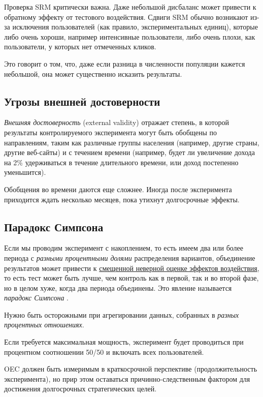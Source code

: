 \documentclass[%
	11pt,
	a4paper,
	utf8,
		]{article}
\begin{document}
Проверка SRM критически важна. Даже небольшой дисбаланс может привести к обратному эффекту от тестового воздействия. Сдвиги SRM обычно возникают из-за исключения пользователей (как правило, экспериментальных единиц), которые либо очень хороши, например интенсивные пользователи, либо очень плохи, как пользователи, у которых нет отмеченных кликов.

Это говорит о том, что, даже если разница в численности популяции кажется небольшой, она может существенно исказить результаты.

\subsection{Угрозы внешней достоверности}

\emph{Внешняя достоверность} (external validity) отражает степень, в которой результаты контролируемого эксперимента могут быть обобщены по направлениям, таким как различные группы населения (например, другие страны, другие веб-сайты) и с течением времени (например, будет ли увеличение дохода на 2\% удерживаться в течение длительного времени, или доход постепенно уменьшится). 

Обобщения во времени даются еще сложнее. Иногда после эксперимента приходится ждать несколько месяцев, пока утихнут долгосрочные эффекты.

\subsection{Парадокс Симпсона}

Если мы проводим эксперимент с накоплением, то есть имеем два или более периода с \emph{\color{red}разными процентными долями} распределения вариантов, объединение результатов может привести к \underline{смещенной неверной оценке эффектов воздействия}, то есть тест может быть лучше, чем контроль как в первой, так и во второй фазе, но в целом хуже, когда два периода объединены. Это явление называется \emph{парадокс Симпсона} \cite[]{kohavi:ab-tests-2021}.

Нужно быть осторожными при агрегировании данных, собранных в \emph{разных процентных отношениях}.

Если требуется максимальная мощность, эксперимент будет проводиться при процентном соотношении 50/50 и включать всех пользователей.

OEC должен быть измеримым в краткосрочной перспективе (продолжительность эксперимента), но прир этом оставаться причинно-следственным фактором для достижения  долгосрочных стратегических целей.
\end{document}
